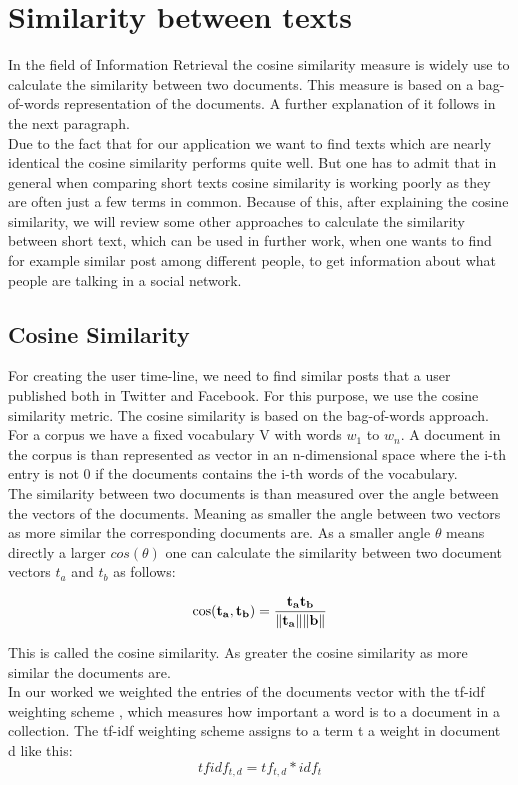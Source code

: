 \section{Similarity between  texts}

In the field of Information Retrieval the cosine similarity measure is widely use to calculate the similarity between two documents. This measure is based on a bag-of-words representation of the documents. A further explanation of it follows in the next paragraph. \\
Due to the fact that for our application we want to find texts which are nearly identical the cosine similarity performs quite well. But one has to admit that in general when comparing short texts cosine similarity is working poorly as they are often just a few terms in common. Because of this, after explaining the cosine similarity, we will review some other approaches to calculate the similarity between short text, which can be used in further work, when one wants to find  for example similar post among different people, to get information about what people are talking in a social network. 

\subsection{Cosine Similarity}

For creating the user time-line, we need to find similar posts that a user published both in Twitter and Facebook. For this purpose, we use the cosine similarity metric. The cosine similarity is based on the bag-of-words approach. For a corpus we have a fixed vocabulary V with words $w_1$ to $w_n$. A document in the corpus is than represented as vector in an n-dimensional space where the i-th entry is  not 0 if the documents contains the i-th words of the vocabulary. \\
The similarity between two documents is than measured over the angle between the vectors of the documents. Meaning as smaller the angle between two vectors as more similar the corresponding documents are. As a smaller angle $\theta$ means directly a larger $cos(\theta)$ one can calculate the similarity between two document vectors  $t_{a}$ and $t_{b}$ as follows:

\begin{equation}
\cos ({\bf t_{a}},{\bf t_{b}})= {{\bf t_{a}} {\bf t_{b}} \over \|{\bf t_{a}}\| \|{\bf \textbf{b}}\|} 
\end{equation}

This is called the cosine similarity. As greater the cosine similarity as more similar the documents are. \\
In our worked we weighted the entries of the documents vector with the tf-idf weighting scheme  , which measures  how important  a word is to a document in a collection. The tf-idf weighting scheme assigns to a term t a weight in document d like  this:
\begin{equation}
tfidf_{t,d} = tf_{t,d} * idf_{t} 
\end{equation}

